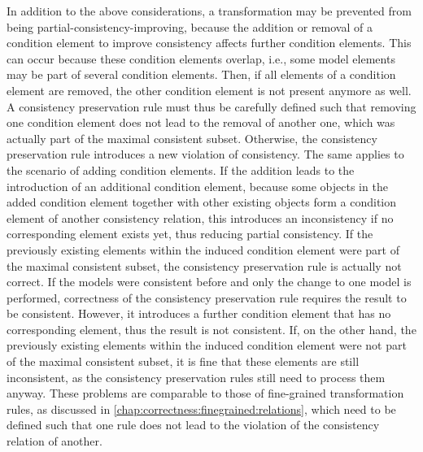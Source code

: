 In addition to the above considerations, a transformation may be prevented from being partial-consistency-improving, because the addition or removal of a condition element to improve consistency affects further condition elements.
This can occur because these condition elements overlap, i.e., some model elements may be part of several condition elements.
Then, if all elements of a condition element are removed, the other condition element is not present anymore as well.
A consistency preservation rule must thus be carefully defined such that removing one condition element does not lead to the removal of another one, which was actually part of the maximal consistent subset.
Otherwise, the consistency preservation rule introduces a new violation of consistency.
The same applies to the scenario of adding condition elements. 
If the addition leads to the introduction of an additional condition element, because some objects in the added condition element together with other existing objects form a condition element of another consistency relation, this introduces an inconsistency if no corresponding element exists yet, thus reducing partial consistency.
If the previously existing elements within the induced condition element were part of the maximal consistent subset, the consistency preservation rule is actually not correct.
If the models were consistent before and only the change to one model is performed, correctness of the consistency preservation rule requires the result to be consistent.
However, it introduces a further condition element that has no corresponding element, thus the result is not consistent.
If, on the other hand, the previously existing elements within the induced condition element were not part of the maximal consistent subset, it is fine that these elements are still inconsistent, as the consistency preservation rules still need to process them anyway.
These problems are comparable to those of fine-grained transformation rules, as discussed in \autoref{chap:correctness:finegrained:relations}, which need to be defined such that one rule does not lead to the violation of the consistency relation of another.

